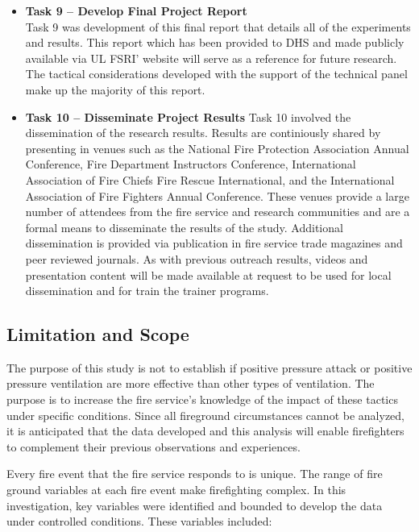 \documentclass{article}
\begin{document}
\begin{itemize}
	\item \textbf{Task 9 – Develop Final Project Report} \\
	Task 9 was development of this final report that details all of the experiments and results. This report which has been provided to DHS and made publicly available via UL FSRI' website will serve as a reference for future research. The tactical considerations developed with the support of the technical  panel make up the majority of this report.
	
	\item \textbf{Task 10 – Disseminate Project Results}
	Task 10 involved the dissemination of the research results. Results are continiously shared by presenting in venues such as the National Fire Protection Association Annual Conference, Fire Department Instructors Conference, International Association of Fire Chiefs Fire Rescue International, and the International Association of Fire Fighters Annual Conference. These venues provide a large number of attendees from the fire service and research communities and are a formal means to disseminate the results of the study. Additional dissemination is provided via publication in fire service trade magazines and peer reviewed journals. As with previous outreach results, videos and presentation content will be made available at request to be used for local dissemination and for train the trainer programs. 

\end{itemize}

\subsection{Limitation and Scope}

The purpose of this study is not to establish if positive pressure attack or positive pressure ventilation are more effective than other types of ventilation. The purpose is to increase the fire service’s knowledge of the impact of these tactics under specific conditions. Since all fireground circumstances cannot be analyzed, it is anticipated that the data developed and this analysis will enable firefighters to complement their previous observations and experiences.

Every fire event that the fire service responds to is unique. The range of fire ground variables at each fire event make firefighting complex. In this investigation, key variables were identified and bounded to develop the data under controlled conditions. These variables included:
\end{document}
